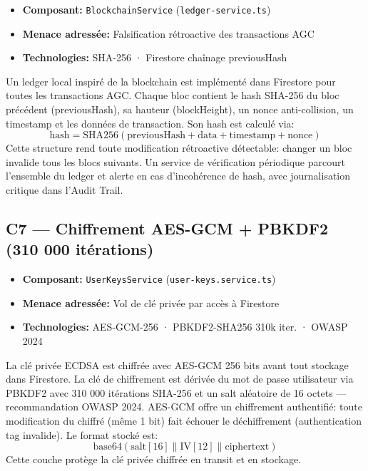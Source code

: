 \documentclass[12pt,a4paper]{report}
\begin{document}
\begin{tcolorbox}[definbox,title={Couche C6 --- Ledger immuable SHA-256}]
  \begin{itemize}[itemsep=5pt]
    \item \textbf{Composant:} \texttt{BlockchainService} (\texttt{ledger-service.ts})
    \item \textbf{Menace adressée:} Falsification rétroactive des transactions AGC
    \item \textbf{Technologies:} SHA-256 · Firestore chaînage previousHash
  \end{itemize}
  \vspace{0.3cm}
  Un ledger local inspiré de la blockchain est implémenté dans Firestore pour toutes les
  transactions AGC. Chaque bloc contient le hash SHA-256 du bloc précédent (previousHash),
  sa hauteur (blockHeight), un nonce anti-collision, un timestamp et les données de
  transaction. Son hash est calculé via:
  \[
    \text{hash} = \text{SHA256}(\text{previousHash} + \text{data} + \text{timestamp} + \text{nonce})
  \]
  Cette structure rend toute modification rétroactive détectable: changer un bloc
  invalide tous les blocs suivants. Un service de vérification périodique
  parcourt l'ensemble du ledger et alerte en cas d'incohérence de hash, avec
  journalisation critique dans l'Audit Trail.
\end{tcolorbox}

\vspace{0.1cm}

\subsection{C7 — Chiffrement AES-GCM + PBKDF2 (310 000 itérations)}

\begin{tcolorbox}[definbox,title={Couche C7 --- Chiffrement AES-GCM + PBKDF2}]
  \begin{itemize}[itemsep=5pt]
    \item \textbf{Composant:} \texttt{UserKeysService} (\texttt{user-keys.service.ts})
    \item \textbf{Menace adressée:} Vol de clé privée par accès à Firestore
    \item \textbf{Technologies:} AES-GCM-256 · PBKDF2-SHA256 310k iter. · OWASP 2024
  \end{itemize}
  \vspace{0.1cm}
  La clé privée ECDSA est chiffrée avec AES-GCM 256 bits avant tout stockage dans Firestore.
  La clé de chiffrement est dérivée du mot de passe utilisateur via PBKDF2 avec 310 000
  itérations SHA-256 et un salt aléatoire de 16 octets --- recommandation OWASP 2024.
  AES-GCM offre un chiffrement authentifié: toute modification du chiffré (même 1 bit) fait
  échouer le déchiffrement (authentication tag invalide). Le format stocké est:
  \[
    \text{base64}(\text{salt}[16] \parallel \text{IV}[12] \parallel \text{ciphertext})
  \]
  Cette couche protège la clé privée chiffrée en transit et en stockage.
\end{tcolorbox}
\end{document}
